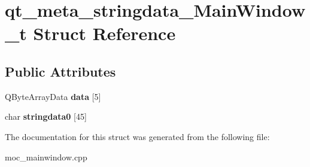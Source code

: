\section{qt\+\_\+meta\+\_\+stringdata\+\_\+\+Main\+Window\+\_\+t Struct Reference}
\label{structqt__meta__stringdata___main_window__t}
\subsection*{Public Attributes}
\begin{DoxyCompactItemize}
\item 
Q\+Byte\+Array\+Data {\bfseries data} [5]\label{structqt__meta__stringdata___main_window__t_a728217305ebd7d8895235c2038c4ed28}

\item 
char {\bfseries stringdata0} [45]\label{structqt__meta__stringdata___main_window__t_aba89971a8b13705ccf5e479a6cf625e5}

\end{DoxyCompactItemize}


The documentation for this struct was generated from the following file\+:\begin{DoxyCompactItemize}
\item 
moc\+\_\+mainwindow.\+cpp\end{DoxyCompactItemize}
